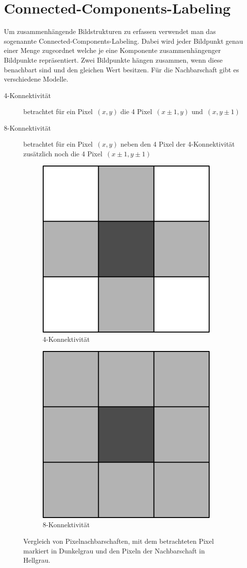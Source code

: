 \section{Connected-Components-Labeling}
\label{sec:connected-components}
\writtenby{\dcauthornameewie}%
Um zusammenhängende Bildstrukturen zu erfassen verwendet man das sogenannte Connected-Components-Labeling.
Dabei wird jeder Bildpunkt genau einer Menge zugeordnet welche je eine Komponente zusammenhängenger Bildpunkte repräsentiert.
Zwei Bildpunkte hängen zusammen, wenn diese benachbart sind und den gleichen Wert besitzen.
Für die Nachbarschaft gibt es verschiedene Modelle.
%
{
\setlength{\labelsep}{\textwidth}
\setlength{\leftmargini}{1.5em}
\begin{description}
\item[4-Konnektivität] betrachtet für ein Pixel~$(x,y)$ die 4 Pixel~$(x\pm1,y)$ und~$(x,y\pm1)$
\item[8-Konnektivität] betrachtet für ein Pixel~$(x,y)$ neben den 4 Pixel der 4-Konnektivität zusätzlich noch die 4 Pixel~$(x\pm1,y\pm1)$
\end{description}
}
%
\begin{figure}[H]
  \centering
  \begin{subfigure}{0.3\columnwidth}
    \centering
    \includegraphics[width=0.5\columnwidth]{img/basics/connected-compontents/4-connectivity}
    \caption{4-Konnektivität}
  \end{subfigure}
  \begin{subfigure}{0.3\columnwidth}
    \centering
    \includegraphics[width=0.5\columnwidth]{img/basics/connected-compontents/8-connectivity}
    \caption{8-Konnektivität}
  \end{subfigure}
  \caption[Vergleich von Pixelnachbarschaften]{Vergleich von Pixelnachbarschaften, mit dem betrachteten Pixel markiert in Dunkelgrau und den Pixeln der Nachbarschaft in Hellgrau.}
\end{figure}
